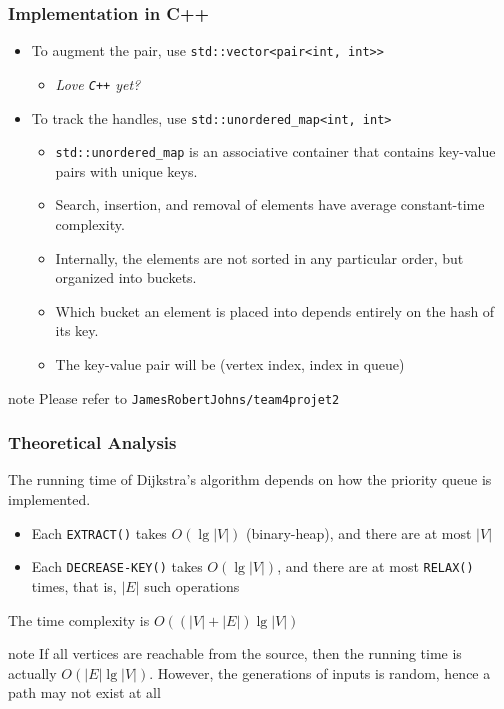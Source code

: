 \documentclass{beamer}
\begin{document}
\begin{frame}
	\frametitle{Implementation in C++}				
	\begin{itemize}
		\item To augment the pair, use \texttt{std::vector<pair<int, int>>} 
		\begin{itemize}
			\item \emph{Love \texttt{C++} yet?}
		\end{itemize}
		\item To track the handles, use \texttt{std::unordered\_map<int, int>} 
		\begin{itemize}
			\item \texttt{std::unordered\_map} is an associative container that contains key-value pairs with unique keys. 
			\item Search, insertion, and removal of elements have average constant-time complexity.
			\item Internally, the elements are not sorted in any particular order, but organized into buckets. 
			\item Which bucket an element is placed into depends entirely on the hash of its key.
			\item The key-value pair will be (vertex index, index in queue)
		\end{itemize}
	\end{itemize}
	\begin{block}{note}
		Please refer to \texttt{JamesRobertJohns/team4projet2} 	
	\end{block}
\end{frame}

\begin{frame}
	\frametitle{Theoretical Analysis}
The running time of Dijkstra’s algorithm depends on how the priority
queue is implemented.
	\begin{itemize}
		\item Each \texttt{EXTRACT()} takes \( O(\lg \lvert{ V }\rvert ) \) (binary-heap), and there are at most \( \lvert{ V }\rvert  \)  
		\item Each \texttt{DECREASE-KEY()} takes \( O(\lg \lvert{ V }\rvert)  \), and there are at most \texttt{RELAX()} times, that is, \( \lvert{ E }\rvert  \)  such operations
	\end{itemize}
	The time complexity is \( O(( \lvert{ V }\rvert + \lvert{ E }\rvert) \lg{\lvert{V}\rvert})  \)
	\onslide<2> \begin{block}{note}
		If all vertices are reachable from the source, then the running time is actually \( O( \lvert{ E }\rvert \lg \lvert{ V }\rvert )  \). However, the generations of inputs is random, hence a path may not exist at all
	\end{block}
\end{frame}
\end{document}

